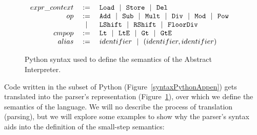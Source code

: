 \begin{figure}
\[\begin{array}{rclr}
  expr\_context &:=& \texttt{Load} ~~|~~ \texttt{Store} ~~|~~ \texttt{Del}  & \\

  op &:=& \texttt{Add} ~~|~~ \texttt{Sub} ~~|~~ \texttt{Mult} ~~|~~ \texttt{Div} ~~|~~
         \texttt{Mod} ~~|~~ \texttt{Pow} \\
     &~~|~~& \texttt{LShift} ~~|~~ \texttt{RShift} ~~|~~ \texttt{FloorDiv}  & \\
  cmpop &:=& \texttt{Lt} ~~|~~ \texttt{LtE} ~~|~~ \texttt{Gt} ~~|~~ \texttt{GtE}  & \\

  alias &:=& identifier ~~|~~ (identifier, identifier) & \\

\end{array}\]
\caption{Python syntax used to define the semantics of the Abstract
  Interpreter.\label{syntaxPython2App}}
\end{figure}

%
%
%
%
%
%
%
%
%

Code written in the subset of Python (Figure~\ref{syntaxPythonAppen}) gets translated into
the parser's representation (Figure~\ref{syntaxPython2App}), over which we define the
semantics of the language. We will no describe the process of translation (parsing), but
we will explore some examples to show why the parser's syntax aids into the definition of
the small-step semantics:

